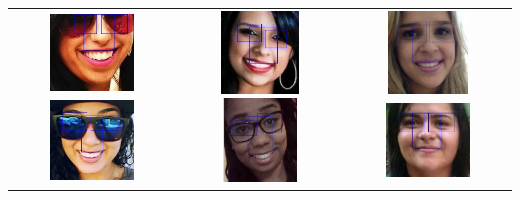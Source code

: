 \begin{table}[ht!]
\begin{center}
\begin{tabular}{c|c|c}
\includegraphics[height=2.2cm,width=2.2cm]{figures/results/detections/brazil/female/lq/aa05c99f-ee93-48a1-8806-1a1a87b21b71.jpeg}
\includegraphics[height=2.2cm,width=2.2cm]{figures/results/detections/brazil/female/lq/387937bc-edc8-4336-8991-6c4745431122.jpeg}
&
\includegraphics[height=2.2cm,width=2.2cm]{figures/results/detections/brazil/female/mq/27193b66-7196-4b0c-bbac-e9a1ed259e93.jpeg}
\includegraphics[height=2.2cm,width=2.2cm]{figures/results/detections/brazil/female/mq/f10dcd8c-e4fc-4fd5-8703-62452512f21c.jpeg}
&
\includegraphics[height=2.2cm,width=2.2cm]{figures/results/detections/brazil/female/hq/ff51f9c4-9655-41e2-8696-55e989dfa5c3.jpeg}
\includegraphics[height=2.2cm,width=2.2cm]{figures/results/detections/brazil/female/hq/53ffce4e-fa85-49f7-8384-603cb3e15b9d.jpeg}
\TBstrut \\ 



\end{tabular}
\end{center}
\end{table}
